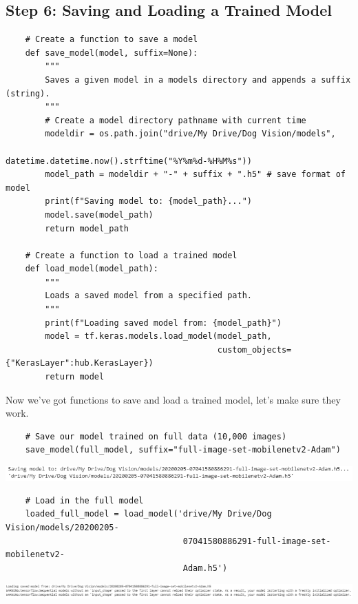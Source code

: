 \documentclass[11pt, a4paper]{article}
\begin{document}
\begin{spacing}{1.1}
	\subsection{Step 6: Saving and Loading a Trained Model}
	\begin{lstlisting}
	# Create a function to save a model
	def save_model(model, suffix=None):
		"""
		Saves a given model in a models directory and appends a suffix (string).
		"""
		# Create a model directory pathname with current time
		modeldir = os.path.join("drive/My Drive/Dog Vision/models",
		                        datetime.datetime.now().strftime("%Y%m%d-%H%M%s"))
		model_path = modeldir + "-" + suffix + ".h5" # save format of model
		print(f"Saving model to: {model_path}...")
		model.save(model_path)
		return model_path
	
	# Create a function to load a trained model
	def load_model(model_path):
		"""
		Loads a saved model from a specified path.
		"""
		print(f"Loading saved model from: {model_path}")
		model = tf.keras.models.load_model(model_path, 
		                                   custom_objects={"KerasLayer":hub.KerasLayer})
		return model \end{lstlisting} \vspace*{1mm}
	Now we've got functions to save and load a trained model, let's make sure they work.
	\begin{lstlisting}
	# Save our model trained on full data (10,000 images)
	save_model(full_model, suffix="full-image-set-mobilenetv2-Adam") \end{lstlisting} \vspace*{1mm}
	\includegraphics[scale=.8]{save_dl_model}
	\begin{lstlisting}
	# Load in the full model
	loaded_full_model = load_model('drive/My Drive/Dog Vision/models/20200205-
	                                07041580886291-full-image-set-mobilenetv2-
	                                Adam.h5') \end{lstlisting} \vspace*{1mm}
	\includegraphics[scale=.48]{load_dl_model} \\

\end{spacing}
\end{document}
